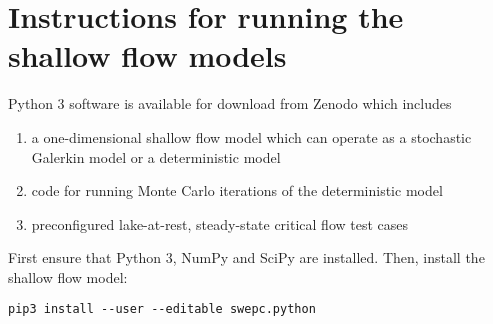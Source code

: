 \section{Instructions for running the shallow flow models}

Python 3 software is available for download from Zenodo \citep{shaw-kesserwani2019b} which includes
\begin{enumerate}
    \item a one-dimensional shallow flow model which can operate as a stochastic Galerkin model or a deterministic model
    \item code for running Monte Carlo iterations of the deterministic model
    \item preconfigured lake-at-rest, steady-state critical flow  test cases
\end{enumerate}
First ensure that Python 3, NumPy and SciPy are installed.
Then, install the shallow flow model:
\begin{verbatim}
pip3 install --user --editable swepc.python
\end{verbatim}

